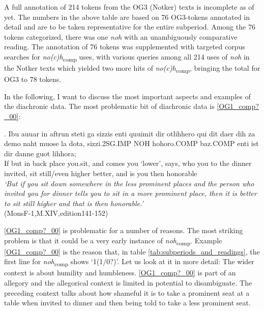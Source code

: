 \documentclass[output=paper,
modfonts
]{langscibook}
\begin{document}
\noindent A full annotation of 214 tokens from the OG3 (Notker) texts is incomplete as of yet. The numbers in the above table are based on 76 OG3-tokens annotated in detail and are to be taken representative for the entire subperiod. Among the 76 tokens categorized, there was one \textit{noh} with an unambiguously comparative reading. The annotation of 76 tokens was supplemented with targeted corpus searches for \textit{no(c)h}\textsubscript{comp} uses, with various queries among all 214 uses of \textit{noh} in the Notker texts which yielded two more hits of \textit{no(c)h}\textsubscript{comp}, bringing the total for OG3 to 78 tokens.

In the following, I want to discuss the most important aspects and examples of the diachronic data. The most problematic bit of diachronic data is \ref{OG1_comp?_00}:

\exg. Ibu auuar in aftrun steti {ga sizzis} enti quuimit dir otlihhero {qui dit} daer dih za demo {naht muose} {la dota,} sizzi.2SG.IMP NOH hohoro.COMP baz.COMP enti ist dir danne {guot lihhora;}\\
If but in back place you.sit, and comes you `lower', says, who you to the dinner invited, sit still/even higher better, and is you then honorable\\
\textit{`But if you sit down somewhere in the less prominent places and the person who invited you for dinner tells you to sit in a more prominent place, then it is better to sit still higher and that is then honorable.'} \label{OG1_comp?_00} \\ \flushright \vspace{-24pt} (MonsF-1,M.XIV,edition141-152)

\ref{OG1_comp?_00} is problematic for a number of reasons. The most striking problem is that it could be a very early instance of \textit{noh}\textsubscript{comp}. Example \ref{OG1_comp?_00} is the reason that, in table \ref{tab:subperiods_and_readings}, the first line for \textit{noh}\textsubscript{comp} shows `1(1/0?)'. Let us look at it in more detail: The wider context is about humility and humbleness. \ref{OG1_comp?_00} is part of an allegory and the allegorical context is limited in potential to disambiguate. The preceding context talks about how shameful it is to take a prominent seat at a table when invited to dinner and then being told to take a less prominent seat.
\end{document}
